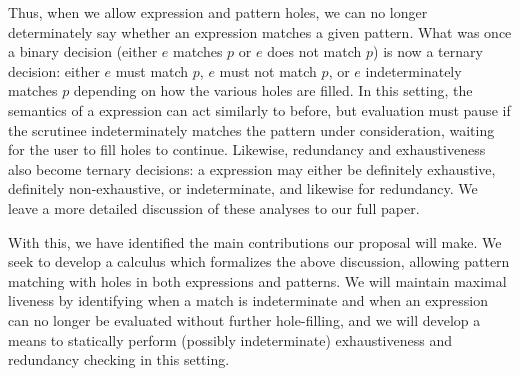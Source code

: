 
Thus, when we allow expression and pattern holes, we can no longer determinately say whether an expression matches a given pattern. What was once a binary decision (either $e$ matches $p$ or $e$ does not match $p$) is now a ternary decision: either $e$ must match $p$, $e$ must not match $p$, or $e$ indeterminately matches $p$ depending on how the various holes are filled. In this setting, the semantics of a  expression can act similarly to before, but evaluation must pause if the scrutinee indeterminately matches the pattern under consideration, waiting for the user to fill holes to continue.
Likewise, redundancy and exhaustiveness also become ternary decisions: a  expression may either be definitely exhaustive, definitely non-exhaustive, or indeterminate, and likewise for redundancy. We leave a more detailed discussion of these analyses to our full paper. 

With this, we have identified the main contributions our proposal will make. We seek to develop a calculus which formalizes the above discussion, allowing pattern matching with holes in both expressions and patterns. We will maintain maximal liveness by identifying when a match is indeterminate and when an expression can no longer be evaluated without further hole-filling, and we will develop a means to statically perform (possibly indeterminate) exhaustiveness and redundancy checking in this setting.

